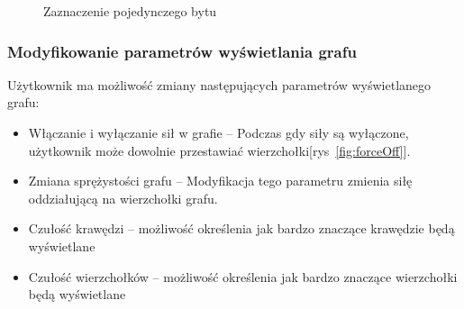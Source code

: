 \documentclass[12pt,a4paper]{article} %
\begin{document}
            \begin{figure}[h]
            \caption{Zaznaczenie pojedynczego bytu}
            \label{fig:highlight}
            \centering
            \end{figure}
        
        \subsubsection{Modyfikowanie parametrów wyświetlania grafu}
        
            Użytkownik ma możliwość zmiany następujących parametrów wyświetlanego grafu:
            \begin{itemize}
                \item Włączanie i wyłączanie sił w grafie -- Podczas gdy siły są wyłączone, użytkownik może dowolnie przestawiać wierzchołki[rys~\ref{fig:forceOff}].
                \item Zmiana sprężystości grafu -- Modyfikacja tego parametru zmienia siłę oddziałującą na wierzchołki grafu.
                \item Czułość krawędzi -- możliwość określenia jak bardzo znaczące krawędzie będą wyświetlane
                \item Czułość wierzchołków -- możliwość określenia jak bardzo znaczące wierzchołki będą wyświetlane
            \end{itemize}
            
\end{document}
